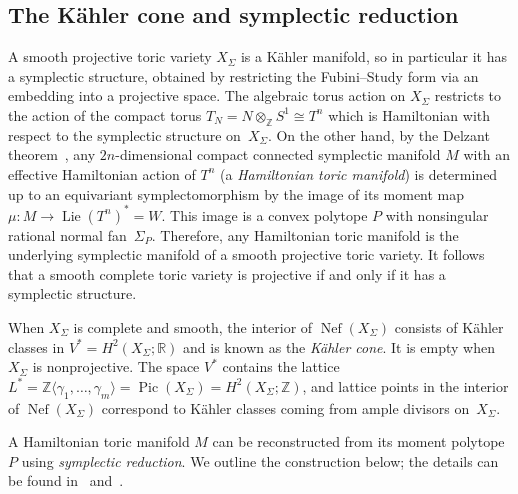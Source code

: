 \documentclass[a4paper]{amsart}
\theoremstyle{definition}
\theoremstyle{remark}
\numberwithin{equation}{section}
\def\R{\mathbb R}
\def\R{\mathbb R}
\def\Z{\mathbb Z}
\newcommand{\<}{\langle}
\renewcommand{\>}{\rangle}
\begin{document}
\subsection{The K\"ahler cone and symplectic reduction}\label{parsr}
A smooth projective toric variety $X_\Sigma$ is a K\"ahler manifold, so in particular it has a symplectic structure, obtained by restricting the Fubini--Study form via an embedding into a projective space. The algebraic torus action on $X_\Sigma$ restricts to the action of the compact torus $T_N=N\otimes_\Z S^1\cong T^n$ which is  Hamiltonian with respect to the symplectic structure on~$X_\Sigma$. On the other hand, by the Delzant theorem~\cite{delz88}, any $2n$-dimensional compact connected symplectic manifold $M$ with an effective Hamiltonian action of $T^n$ (a \emph{Hamiltonian toric manifold}) is determined up to an equivariant symplectomorphism by the image of its moment map $\mu\colon M\to\mathop\mathrm{Lie}(T^n)^*=W$. This image is a convex polytope $P$ with nonsingular rational normal fan~$\Sigma_P$. Therefore, any Hamiltonian toric manifold is the underlying symplectic manifold of a smooth projective toric variety. It follows that a smooth complete toric variety is projective if and only if it has a symplectic structure.

When $X_\Sigma$ is complete and smooth, the interior of $\mathop\mathrm{Nef}(X_\Sigma)$ consists of K\"ahler classes in $V^*=H^2(X_\Sigma;\R)$ and is known as the \emph{K\"ahler cone}. It is empty when $X_\Sigma$ is nonprojective. The space $V^*$ contains the lattice $L^*=\Z\langle\gamma_1,\ldots,\gamma_m\rangle=\mathop\mathrm{Pic}(X_\Sigma)=H^2(X_\Sigma;\Z)$, and lattice points in the interior of $\mathop\mathrm{Nef}(X_\Sigma)$ correspond to K\"ahler classes coming from ample divisors on~$X_\Sigma$.

A Hamiltonian toric manifold $M$ can be reconstructed from its moment polytope $P$ using \emph{symplectic reduction}. We outline the construction below; the details can be found in~\cite[Chapter~6]{audi91} and~\cite[Chapter~1]{guil94}.
\end{document}
